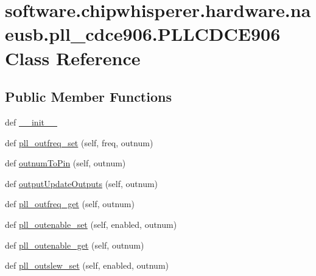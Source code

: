 \hypertarget{classsoftware_1_1chipwhisperer_1_1hardware_1_1naeusb_1_1pll__cdce906_1_1PLLCDCE906}{}\section{software.\+chipwhisperer.\+hardware.\+naeusb.\+pll\+\_\+cdce906.\+P\+L\+L\+C\+D\+C\+E906 Class Reference}
\label{classsoftware_1_1chipwhisperer_1_1hardware_1_1naeusb_1_1pll__cdce906_1_1PLLCDCE906}
\subsection*{Public Member Functions}
\begin{DoxyCompactItemize}
\item 
def \hyperlink{classsoftware_1_1chipwhisperer_1_1hardware_1_1naeusb_1_1pll__cdce906_1_1PLLCDCE906_a5f455ff834cdfa1c1c0c6f1e5c407209}{\+\_\+\+\_\+init\+\_\+\+\_\+}
\item 
def \hyperlink{classsoftware_1_1chipwhisperer_1_1hardware_1_1naeusb_1_1pll__cdce906_1_1PLLCDCE906_aa387854514568c9ed8c5b6cb44bef15a}{pll\+\_\+outfreq\+\_\+set} (self, freq, outnum)
\item 
def \hyperlink{classsoftware_1_1chipwhisperer_1_1hardware_1_1naeusb_1_1pll__cdce906_1_1PLLCDCE906_a222df22027181602b25589e998dd9b6e}{outnum\+To\+Pin} (self, outnum)
\item 
def \hyperlink{classsoftware_1_1chipwhisperer_1_1hardware_1_1naeusb_1_1pll__cdce906_1_1PLLCDCE906_a50d1a9f7a7a440c15956e46a14e055d6}{output\+Update\+Outputs} (self, outnum)
\item 
def \hyperlink{classsoftware_1_1chipwhisperer_1_1hardware_1_1naeusb_1_1pll__cdce906_1_1PLLCDCE906_a41e29e5d269e506aaa6e428417c1d5a8}{pll\+\_\+outfreq\+\_\+get} (self, outnum)
\item 
def \hyperlink{classsoftware_1_1chipwhisperer_1_1hardware_1_1naeusb_1_1pll__cdce906_1_1PLLCDCE906_a5678f38e355785b60118d7df7fa96819}{pll\+\_\+outenable\+\_\+set} (self, enabled, outnum)
\item 
def \hyperlink{classsoftware_1_1chipwhisperer_1_1hardware_1_1naeusb_1_1pll__cdce906_1_1PLLCDCE906_a27fa5a309bb26018bffa664c579e7ab0}{pll\+\_\+outenable\+\_\+get} (self, outnum)
\item 
def \hyperlink{classsoftware_1_1chipwhisperer_1_1hardware_1_1naeusb_1_1pll__cdce906_1_1PLLCDCE906_afe6df78df41a22177462554499e93267}{pll\+\_\+outslew\+\_\+set} (self, enabled, outnum)

\end{DoxyCompactItemize}

